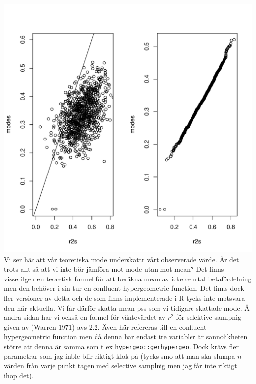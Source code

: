 \documentclass[]{article}
\begin{document}
\includegraphics{2016_w09_files/figure-latex/unnamed-chunk-5-1.pdf} Vi
ser här att vår teoretiska mode underskattr vårt observerade värde. Är
det trots allt så att vi inte bör jämföra mot mode utan mot mean? Det
finns visserilgen en teoretisk formel för att beräkna mean av icke
cenrtal betafördelning men den behöver i sin tur en confluent
hypergeometric function. Det finns dock fler versioner av detta och de
som finns implementerade i R tycks inte motsvara den här aktuella. Vi
får därför skatta mean pss som vi tidigare skattade mode. Å andra sidan
har vi också en formel för väntevärdet av \(r^2\) för selektive samlpnig
given av (Warren 1971) avs 2.2. Även här refereras till en confluent
hypergeometric function men då denna har endast tre variabler är
sannolikheten större att denna är samma som t ex
\texttt{hypergeo::genhypergeo}. Dock krävs fler parametrar som jag inble
blir riktigt klok på (tycks smo att man ska slumpa \(n\) värden från
varje punkt tagen med selective samplnig men jag får inte riktigt ihop
det).
\end{document}
